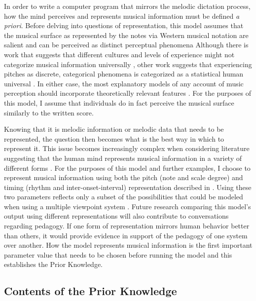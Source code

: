 \documentclass[12pt,]{book}
\begin{document}
In order to write a computer program that mirrors the melodic dictation process, how the mind perceives and represents musical information must be defined \emph{a priori}.
Before delving into questions of representation, this model assumes that the musical surface as represented by the notes via Western musical notation are salient and can be perceived as distinct perceptual phenomena
Although there is work that suggests that different cultures and levels of experience might not categorize musical information universally \citep{mcdermottIndifferenceDissonanceNative2016}, other work suggests that experiencing pitches as discrete, categorical phenomena is categorized as a statistical human universal \citep{savageStatisticalUniversalsReveal2015}.
In either case, the most explanatory models of any account of music perception should incorporate theoretically relevant features \citep{harrisonDissociatingSensoryCognitive2018}.
For the purposes of this model, I assume that individuals do in fact perceive the musical surface similarly to the written score.

Knowing that it is melodic information or melodic data that needs to be represented, the question then becomes what is the best way in which to represent it.
This issue becomes increasingly complex when considering literature suggesting that the human mind represents musical information in a variety of different forms \citep{krumhanslCognitiveFoundationsMusical2001, levitinCurrentAdvancesCognitive2009}.
For the purposes of this model and further examples, I choose to represent musical information using both the pitch (note and scale degree) and timing (rhythm and inter-onset-interval) representation described in \citet{pearceStatisticalLearningProbabilistic2018a}.
Using these two parameters reflects only a subset of the possibilities that could be modeled when using a multiple viewpoint system \citep{conklinMultipleViewpointSystems1995}.
Future research comparing this model's output using different representations will also contribute to conversations regarding pedagogy.
If one form of representation mirrors human behavior better than others, it would provide evidence in support of the pedagogy of one system over another.
How the model represents musical information is the first important parameter value that needs to be chosen before running the model and this establishes the Prior Knowledge.

\hypertarget{contents-of-the-prior-knowledge}{%
\subsection{Contents of the Prior Knowledge}\label{contents-of-the-prior-knowledge}}
\end{document}
